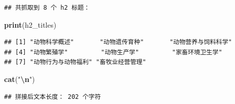 \documentclass[
]{ctexart}
\newenvironment{Shaded}{\begin{snugshade}}{\end{snugshade}}
\newcommand{\AttributeTok}[1]{\textcolor[rgb]{0.13,0.29,0.53}{#1}}
\newcommand{\CommentTok}[1]{\textcolor[rgb]{0.56,0.35,0.01}{\textit{#1}}}
\newcommand{\DecValTok}[1]{\textcolor[rgb]{0.00,0.00,0.81}{#1}}
\newcommand{\FunctionTok}[1]{\textcolor[rgb]{0.13,0.29,0.53}{\textbf{#1}}}
\newcommand{\NormalTok}[1]{#1}
\newcommand{\OtherTok}[1]{\textcolor[rgb]{0.56,0.35,0.01}{#1}}
\newcommand{\SpecialCharTok}[1]{\textcolor[rgb]{0.81,0.36,0.00}{\textbf{#1}}}
\newcommand{\StringTok}[1]{\textcolor[rgb]{0.31,0.60,0.02}{#1}}
\begin{document}
\begin{verbatim}
## 共抓取到 8 个 h2 标题：
\end{verbatim}

\begin{Shaded}
\begin{Highlighting}[]
\FunctionTok{print}\NormalTok{(h2\_titles)}
\end{Highlighting}
\end{Shaded}

\begin{verbatim}
## [1] "动物科学概述"       "动物遗传育种"       "动物营养与饲料科学"
## [4] "动物繁殖学"         "动物生产学"         "家畜环境卫生学"    
## [7] "动物行为与动物福利" "畜牧业经营管理"
\end{verbatim}

\begin{Shaded}
\begin{Highlighting}[]
\FunctionTok{cat}\NormalTok{(}\StringTok{"}\SpecialCharTok{\textbackslash{}n}\StringTok{"}\NormalTok{)}
\end{Highlighting}
\end{Shaded}

\begin{Shaded}
\end{Shaded}

\begin{verbatim}
## 拼接后文本长度： 202 个字符
\end{verbatim}
\end{document}
